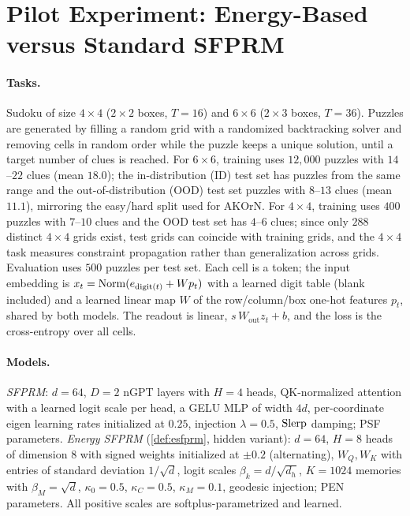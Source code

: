 \section{Pilot Experiment: Energy-Based versus Standard SFPRM}
\label{app:pilot}

\paragraph{Tasks.}
Sudoku of size $4\times4$ ($2\times2$ boxes, $T=16$) and $6\times6$ ($2\times3$ boxes, $T=36$).
Puzzles are generated by filling a random grid with a randomized backtracking solver and removing
cells in random order while the puzzle keeps a unique solution, until a target number of clues is
reached. For $6\times6$, training uses $12{,}000$ puzzles with $14$--$22$ clues (mean $18.0$); the
in-distribution (ID) test set has puzzles from the same range and the out-of-distribution (OOD) test
set puzzles with $8$--$13$ clues (mean $11.1$), mirroring the easy/hard split used for AKOrN. For
$4\times4$, training uses $400$ puzzles with $7$--$10$ clues and the OOD test set has $4$--$6$
clues; since only $288$ distinct $4\times4$ grids exist, test grids can coincide with training grids,
and the $4\times4$ task measures constraint propagation rather than generalization across grids.
Evaluation uses $500$ puzzles per test set. Each cell is a token; the input embedding is
$x_t=\operatorname{Norm}(e_{\mathrm{digit}(t)}+Wp_t)$ with a learned digit table (blank included) and a learned
linear map $W$ of the row/column/box one-hot features $p_t$, shared by both models. The readout is
linear, $s\,W_{\mathrm{out}}z_t+b$, and the loss is the cross-entropy over all cells.

\paragraph{Models.}
\emph{SFPRM}: $d=64$, $D=2$ nGPT layers with $H=4$ heads, QK-normalized attention with a learned
logit scale per head, a GELU MLP of width $4d$, per-coordinate eigen learning rates initialized at
$0.25$, injection $\lambda=0.5$, $\operatorname{Slerp}$ damping; PSF parameters. \emph{Energy SFPRM}
(\cref{def:esfprm}, hidden variant): $d=64$, $H=8$ heads of dimension $8$ with signed weights
initialized at $\pm0.2$ (alternating), $W_Q,W_K$ with entries of standard deviation $1/\sqrt d$,
logit scales $\beta_k=d/\sqrt{d_h}$, $K=1024$ memories with $\beta_M=\sqrt d$, $\kappa_0=0.5$,
$\kappa_C=0.5$, $\kappa_M=0.1$, geodesic injection; PEN parameters. All positive scales are
softplus-parametrized and learned.

